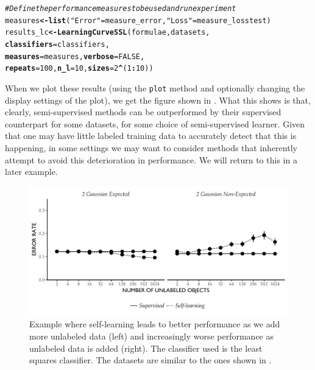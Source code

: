 \documentclass[twoside]{memoir}\usepackage[]{graphicx}\usepackage{xcolor}
\makeatletter
\def\maxwidth{ %
  \ifdim\Gin@nat@width>\linewidth
    \linewidth
  \else
    \Gin@nat@width
  \fi
}
\newcommand{\hlnum}[1]{\textcolor[rgb]{0,0,0}{#1}}%
\newcommand{\hlstr}[1]{\textcolor[rgb]{0,0,0}{#1}}%
\newcommand{\hlcom}[1]{\textcolor[rgb]{0.4,0.4,0.4}{\textit{#1}}}%
\newcommand{\hlopt}[1]{\textcolor[rgb]{0,0,0}{\textbf{#1}}}%
\newcommand{\hlstd}[1]{\textcolor[rgb]{0,0,0}{#1}}%
\newcommand{\hlkwb}[1]{\textcolor[rgb]{0,0,0}{\textbf{#1}}}%
\newcommand{\hlkwc}[1]{\textcolor[rgb]{0,0,0}{\textbf{#1}}}%
\newcommand{\hlkwd}[1]{\textcolor[rgb]{0,0,0}{\textbf{#1}}}%
\newenvironment{kframe}{%
 \def\at@end@of@kframe{}%
 \ifinner\ifhmode%
  \def\at@end@of@kframe{\end{minipage}}%
  \begin{minipage}{\columnwidth}%
 \fi\fi%
 \def\FrameCommand##1{\hskip\@totalleftmargin \hskip-\fboxsep
 \colorbox{shadecolor}{##1}\hskip-\fboxsep
     \hskip-\linewidth \hskip-\@totalleftmargin \hskip\columnwidth}%
 \MakeFramed {\advance\hsize-\width
   \@totalleftmargin\z@ \linewidth\hsize
   \@setminipage}}%
 {\par\unskip\endMakeFramed%
 \at@end@of@kframe}
\newenvironment{knitrout}{}{} %
\makeatother
\begin{document}
\begin{knitrout}
\begin{kframe}
\begin{alltt}
\hlcom{# Define the performance measures to be used and run experiment}
\hlstd{measures} \hlkwb{<-} \hlkwd{list}\hlstd{(}\hlstr{"Error"} \hlstd{=  measure_error,} \hlstr{"Loss"} \hlstd{= measure_losstest)}
\hlstd{results_lc} \hlkwb{<-} \hlkwd{LearningCurveSSL}\hlstd{(formulae,datasets,}
                           \hlkwc{classifiers}\hlstd{=classifiers,}
                           \hlkwc{measures}\hlstd{=measures,}\hlkwc{verbose}\hlstd{=}\hlnum{FALSE}\hlstd{,}
                           \hlkwc{repeats}\hlstd{=}\hlnum{100}\hlstd{,}\hlkwc{n_l}\hlstd{=}\hlnum{10}\hlstd{,}\hlkwc{sizes} \hlstd{=} \hlnum{2}\hlopt{^}\hlstd{(}\hlnum{1}\hlopt{:}\hlnum{10}\hlstd{))}
\end{alltt}
\end{kframe}
\end{knitrout}
\noindent When we plot these results (using the \texttt{plot} method and optionally changing the display settings of the plot), we get the figure shown in . What this shows is that, clearly, semi-supervised methods can be outperformed by their supervised counterpart for some datasets, for some choice of semi-supervised learner. Given that one may have little labeled training data to accurately detect that this is happening, in some settings we may want to consider methods that inherently attempt to avoid this deterioration in performance. We will return to this in a later example.

\begin{knitrout}
\color{fgcolor}\begin{figure}
\includegraphics[width=\maxwidth]{figure/plot-lc-1} \caption{Example where self-learning leads to better performance as we add more unlabeled data (left) and increasingly worse performance as unlabeled data is added (right). The classifier used is the least squares classifier. The datasets are similar to the ones shown in .}\label{fig:plot-lc}
\end{figure}


\end{knitrout}
\end{document}
